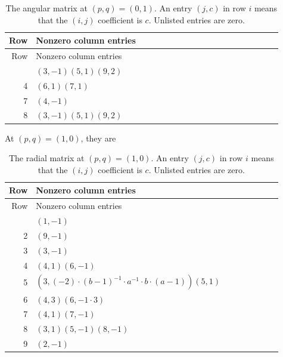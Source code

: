 \begingroup\small
\setlength{\tabcolsep}{3pt}
\renewcommand{\arraystretch}{1.16}
\begin{longtable}{@{}r>{\raggedright\arraybackslash}p{0.91\linewidth}@{}}
\caption{The angular matrix at $(p,q)=(0,1)$. An entry $(j,c)$ in row $i$ means that the $(i,j)$ coefficient is $c$. Unlisted entries are zero.}\label{supp:matrix-A_pzero}\\
\toprule Row & Nonzero column entries\\\midrule\endfirsthead
\toprule Row & Nonzero column entries\\\midrule\endhead
\bottomrule\endfoot
1 & \((3,-1)\)\allowbreak\quad \((5,1)\)\allowbreak\quad \((9,2)\)\\
4 & \((6,1)\)\allowbreak\quad \((7,1)\)\\
7 & \((4,-1)\)\\
8 & \((3,-1)\)\allowbreak\quad \((5,1)\)\allowbreak\quad \((9,2)\)\\
\end{longtable}
\endgroup

At $(p,q)=(1,0)$, they are

\begingroup\small
\setlength{\tabcolsep}{3pt}
\renewcommand{\arraystretch}{1.16}
\begin{longtable}{@{}r>{\raggedright\arraybackslash}p{0.91\linewidth}@{}}
\caption{The radial matrix at $(p,q)=(1,0)$. An entry $(j,c)$ in row $i$ means that the $(i,j)$ coefficient is $c$. Unlisted entries are zero.}\label{supp:matrix-R_qzero}\\
\toprule Row & Nonzero column entries\\\midrule\endfirsthead
\toprule Row & Nonzero column entries\\\midrule\endhead
\bottomrule\endfoot
1 & \((1,-1)\)\\
2 & \((9,-1)\)\\
3 & \((3,-1)\)\\
4 & \((4,1)\)\allowbreak\quad \((6,-1)\)\\
5 & \((3,\left(-2\right) \cdot (b - 1)^{-1} \cdot a^{-1} \cdot b \cdot (a - 1))\)\allowbreak\quad \((5,1)\)\\
6 & \((4,3)\)\allowbreak\quad \((6,-1 \cdot 3)\)\\
7 & \((4,1)\)\allowbreak\quad \((7,-1)\)\\
8 & \((3,1)\)\allowbreak\quad \((5,-1)\)\allowbreak\quad \((8,-1)\)\\
9 & \((2,-1)\)\\
\end{longtable}
\endgroup


